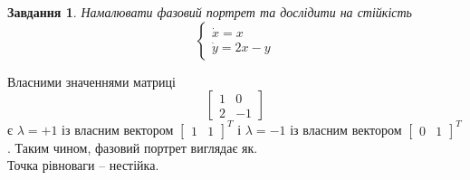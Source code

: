 \documentclass[12pt]{article} %
\newtheorem{prob}{Завдання}
\begin{document}
\begin{prob}Намалювати фазовий портрет та дослідити на стійкість
	\[\begin{cases}\dot{x}=x\\\dot{y}=2x-y\end{cases}\]\end{prob}
	Власними значеннями матриці 
	\[\begin{bmatrix}1&0\\2&-1\end{bmatrix}\]
		є $\lambda=+1$ із власним вектором $\begin{bmatrix}1&1\end{bmatrix}^T$ і $\lambda=-1$ із власним вектором $\begin{bmatrix}0&1
		\end{bmatrix}^T$. Таким чином, фазовий портрет виглядає як.\\
		Точка рівноваги -- нестійка.
\end{document}
